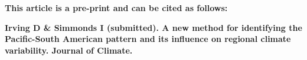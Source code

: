 \textbf{This article is a pre-print and can be cited as follows:}    

\textbf{Irving D & Simmonds I (submitted). A new method for identifying the Pacific-South American pattern and its influence on regional climate variability. Journal of Climate.}